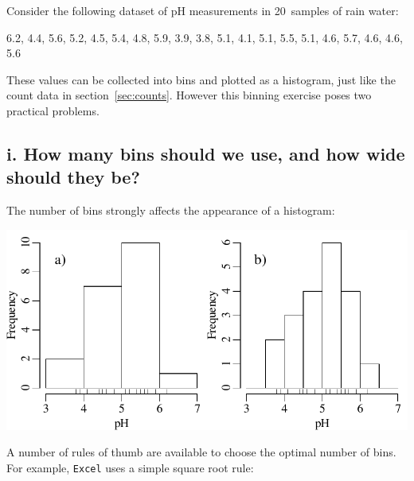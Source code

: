 Consider the following dataset of pH measurements in 20~samples of
rain water:

\begin{center}
6.2, 4.4, 5.6, 5.2, 4.5, 5.4, 4.8, 5.9, 3.9, 3.8, 5.1, 4.1, 5.1, 5.5,
5.1, 4.6, 5.7, 4.6, 4.6, 5.6
\end{center}

These values can be collected into bins and plotted as a histogram,
just like the count data in section~\ref{sec:counts}. However this
binning exercise poses two practical problems.

\subsection*{i. How many bins should we use, and how wide should they be?}

The number of bins strongly affects the appearance of a histogram:

\noindent\begin{minipage}[t][][b]{.5\textwidth}
  \includegraphics[width=\textwidth]{../figures/binwidth.pdf}\medskip
\end{minipage}
\begin{minipage}[t][][t]{.5\textwidth}
  \label{fig:binwidth}
\end{minipage}

A number of rules of thumb are available to choose the optimal number
of bins. For example, \texttt{Excel} uses a simple square root rule:

